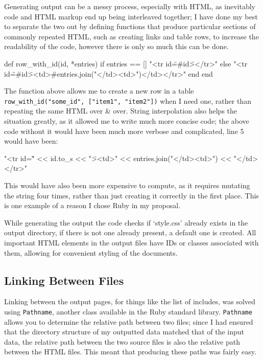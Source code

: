 Generating output can be a messy process, especially with HTML, as inevitably
code and HTML markup end up being interleaved together; I have done my best to
separate the two out by defining functions that produce particular sections of
commonly repeated HTML, such as creating links and table rows, to increase the
readability of the code, however there is only so much this can be done.

\begin{code}[language=ruby, gobble=2]
  def row_with_id(id, *entries)
    if entries == []
      "<tr id=\"#{id}\"></tr>"
    else
      "<tr id=\"#{id}\"><td>#{entries.join("</td><td>")}</td></tr>\n"
    end
  end
\end{code}

The function above allows me to create a new row in a table
\lstinline|row_with_id("some_id", ["item1", "item2"])| when I need one, rather
than repeating the same HTML over \& over. String interpolation also helps the
situation greatly, as it allowed me to write much more concise code; the above
code without it would have been much more verbose and complicated, line 5 would
have been:

\begin{code}[language=ruby, gobble=2]
  "<tr id=\"" << id.to_s << "\"><td>" << entries.join("</td><td>") << "</td></tr>\n"
\end{code}

This would have also been more expensive to compute, as it requires mutating the
string four times, rather than just creating it correctly in the first place.
This is one example of a reason I chose Ruby in my proposal.

While generating the output the code checks if `style.css' already exists in the
output directory, if there is not one already present, a default one is created.
All important HTML elements in the output files have IDs or classes associated
with them, allowing for convenient styling of the documents.

  \subsection{Linking Between Files}
    Linking between the output pages, for things like the list of includes, was
    solved using \lstinline|Pathname|, another class available in the Ruby
    standard library. \lstinline|Pathname| allows you to determine the relative
    path between two files; since I had ensured that the directory structure of
    my outputted data matched that of the input data, the relative path between
    the two source files is also the relative path between the HTML files. This
    meant that producing these paths was fairly easy.


